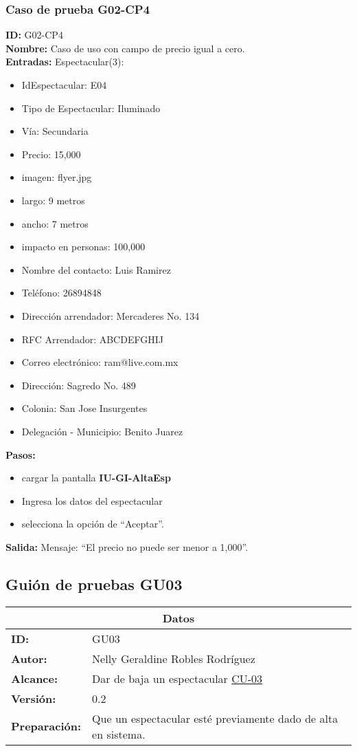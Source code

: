 \subsubsection{Caso de prueba G02-CP4}
\textbf{ID:} G02-CP4\\
\textbf{Nombre:} Caso de uso con campo de precio igual a cero.\\
\textbf{Entradas:} 
Espectacular(3):
\begin{itemize}
    \item IdEspectacular: E04
    \item Tipo de Espectacular: Iluminado
    \item Vía: Secundaria
    \item Precio: 15,000
    \item imagen: flyer.jpg
    \item largo: 9 metros
    \item ancho: 7 metros
    \item impacto en personas: 100,000
    \item Nombre del contacto: Luis Ramirez
    \item Teléfono: 26894848
    \item Dirección arrendador: Mercaderes No. 134
    \item RFC Arrendador: ABCDEFGHIJ
    \item Correo electrónico: ram@live.com.mx
    \item Dirección: Sagredo No. 489
    \item Colonia: San Jose Insurgentes
    \item Delegación - Municipio: Benito Juarez
\end{itemize} 
\textbf{Pasos:}
\begin{itemize}
\item cargar la pantalla \textbf{IU-GI-AltaEsp}
    \item Ingresa los datos del espectacular
    \item selecciona la opción de ``Aceptar''.
\end{itemize}
\textbf{Salida:}
Mensaje: ``El precio no puede ser menor a 1,000''.
\clearpage

\subsection{Guión de pruebas GU03}
\begin{table}[htbp]
\centering
\begin{tabular}{| p{5cm}| p{13cm} |} \hline
\multicolumn{2}{|c|}{\textbf{Datos}} \\ \hline
\textbf{ID:}&GU03\\ \hline
\textbf{Autor:}&Nelly Geraldine Robles Rodríguez\\ \hline
\textbf{Alcance:}&Dar de baja un espectacular \hyperlink{CU:CU03}{CU-03}\\ \hline
\textbf {Versión:}&0.2 \\ \hline
\textbf{Preparación:}&Que un espectacular esté previamente dado de alta en sistema.\\ \hline
\end{tabular}
\end{table}

